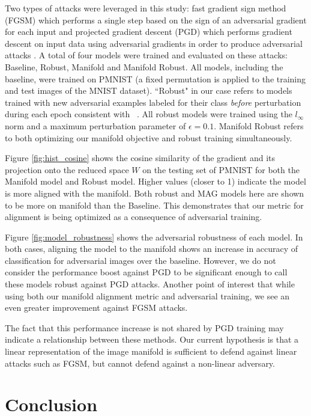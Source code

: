 Two types of attacks were leveraged in this study: fast gradient sign
method (FGSM) \citep{goodfellow_explaining_2014} which performs a
single step based on the sign of an adversarial gradient for each
input and projected gradient descent (PGD) which performs gradient
descent on input data using adversarial gradients in order to produce
adversarial attacks \citep{madry_towards_2017}.
A total of four models were trained and evaluated on these attacks: Baseline, Robust, Manifold and Manifold Robust.
All models, including the baseline, were trained on PMNIST (a fixed
permutation is applied to the training and test images of the MNIST dataset).
``Robust" in our case refers to models trained with new adversarial
examples labeled for their class \emph{before} perturbation during
each epoch consistent with ~\citet{tramer2019adversarial}. All robust
models were trained using the $l_\infty$ norm and a maximum
perturbation parameter of $\epsilon = 0.1$. Manifold Robust refers to
both optimizing our manifold objective and robust training simultaneously.

Figure \ref{fig:hist_cosine} shows the cosine similarity of the
gradient and its projection onto the reduced space $W$ on the testing set of PMNIST for both the Manifold model and Robust model.
Higher values (closer to 1) indicate the model is more aligned with the manifold.
Both robust and MAG models here are shown to be more on manifold than the Baseline.
This demonstrates that our metric for alignment is being optimized as a consequence of adversarial training.

Figure \ref{fig:model_robustness} shows the adversarial robustness of each model.
In both cases, aligning the model to the manifold shows an increase in
accuracy of classification for adversarial images over the baseline.
However, we do not consider the performance boost against PGD to be significant enough to call these models robust against PGD attacks.
Another point of interest that while using both our manifold alignment metric and adversarial training, we see an even greater improvement against FGSM attacks.

The fact that this performance increase is not shared by PGD training may indicate a relationship between these methods.
Our current hypothesis is that a linear representation of the image manifold is sufficient to defend against linear attacks such as FGSM, but cannot defend against a non-linear adversary.

\section{Conclusion}


